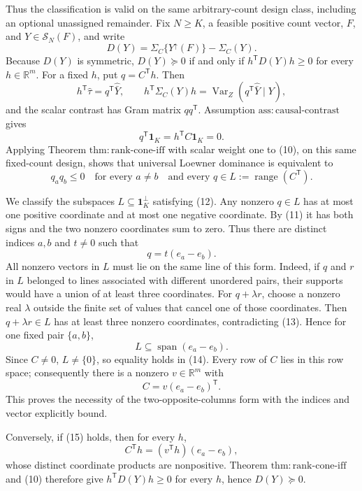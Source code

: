 Thus the classification is valid on the same arbitrary-count design class, including an optional unassigned remainder.
Fix \(N\geq K\), a feasible positive count vector, \(F\), and \(Y\in\mathcal S_N(F)\), and write
\[
D(Y)=\Sigma_C\{Y^{\uparrow}(F)\}-\Sigma_C(Y).
\]
Because \(D(Y)\) is symmetric, \(D(Y)\succeq0\) if and only if \(h^{\mathsf T}D(Y)h\geq0\) for every \(h\in\mathbb R^m\).  For a fixed \(h\), put \(q=C^{\mathsf T}h\).  Then
\[
h^{\mathsf T}\widehat\tau=q^{\mathsf T}\widehat{\bar Y},
\qquad
h^{\mathsf T}\Sigma_C(Y)h
=\operatorname{Var}_Z(q^{\mathsf T}\widehat{\bar Y}\mid Y), \tag{10}
\]
and the scalar contrast has Gram matrix \(qq^{\mathsf T}\).  Assumption \(\mathrm{ass{:}causal\text{-}contrast}\) gives
\[
q^{\mathsf T}\mathbf 1_K=h^{\mathsf T}C\mathbf 1_K=0. \tag{11}
\]
Applying Theorem \(\mathrm{thm{:}rank\text{-}cone\text{-}iff}\) with scalar weight one to (10), on this same fixed-count design, shows that universal Loewner dominance is equivalent to
\[
q_aq_b\leq0
\quad\text{for every }a\ne b
\quad\text{and every }q\in L:=\operatorname{range}(C^{\mathsf T}). \tag{12}
\]

We classify the subspaces \(L\subseteq\mathbf 1_K^{\perp}\) satisfying (12).  Any nonzero \(q\in L\) has at most one positive coordinate and at most one negative coordinate.  By (11) it has both signs and the two nonzero coordinates sum to zero.  Thus there are distinct indices \(a,b\) and \(t\ne0\) such that
\[
q=t(e_a-e_b). \tag{13}
\]
All nonzero vectors in \(L\) must lie on the same line of this form.  Indeed, if \(q\) and \(r\) in \(L\) belonged to lines associated with different unordered pairs, their supports would have a union of at least three coordinates.  For \(q+\lambda r\), choose a nonzero real \(\lambda\) outside the finite set of values that cancel one of those coordinates.  Then \(q+\lambda r\in L\) has at least three nonzero coordinates, contradicting (13).  Hence for one fixed pair \(\{a,b\}\),
\[
L\subseteq\operatorname{span}(e_a-e_b). \tag{14}
\]
Since \(C\ne0\), \(L\ne\{0\}\), so equality holds in (14).  Every row of \(C\) lies in this row space; consequently there is a nonzero \(v\in\mathbb R^m\) with
\[
C=v(e_a-e_b)^{\mathsf T}. \tag{15}
\]
This proves the necessity of the two-opposite-columns form with the indices and vector explicitly bound.

Conversely, if (15) holds, then for every \(h\),
\[
C^{\mathsf T}h=(v^{\mathsf T}h)(e_a-e_b),
\]
whose distinct coordinate products are nonpositive.  Theorem \(\mathrm{thm{:}rank\text{-}cone\text{-}iff}\) and (10) therefore give \(h^{\mathsf T}D(Y)h\geq0\) for every \(h\), hence \(D(Y)\succeq0\).

